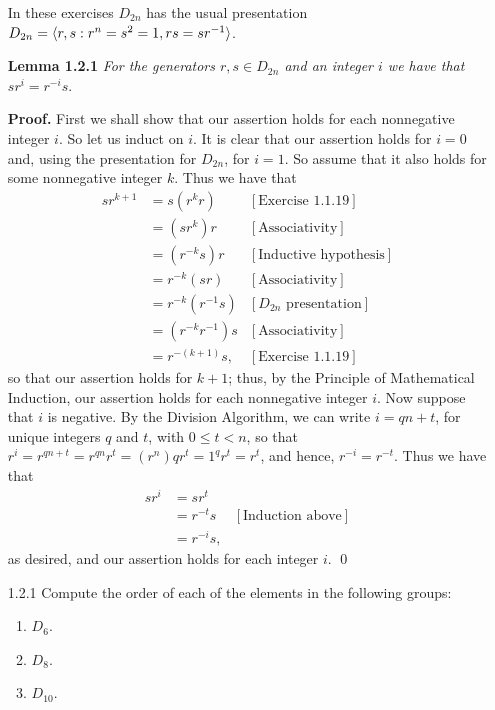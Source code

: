 \begin{enumerate}
   \item[]        In these exercises $D_{2n}$ has the usual presentation
                  $D_{2n} = \langle r, s : r^n = s^2 = 1, rs = sr^{-1} \rangle$.
   \item[]        \textbf{Lemma 1.2.1} \textit{For the generators
                  $r, s \in D_{2n}$ and an integer $i$ we have that
                  $sr^i = r^{-i}s$}.
                  
      \textbf{Proof.} First we shall show that our assertion holds for each
      nonnegative integer $i$. So let us induct on $i$. It is clear that our
      assertion holds for $i = 0$ and, using the presentation for $D_{2n}$, for
      $i = 1$. So assume that it also holds for some nonnegative integer $k$.
      Thus we have that
      \begin{align*}
         sr^{k + 1} &= s(r^kr) &[\text{Exercise 1.1.19}] \\
                    &= (sr^k)r &[\text{Associativity}] \\
                    &= (r^{-k}s)r &[\text{Inductive hypothesis}] \\
                    &= r^{-k}(sr) &[\text{Associativity}] \\
                    &= r^{-k}(r^{-1}s) &[D_{2n} \text{ presentation}] \\
                    &= (r^{-k}r^{-1})s &[\text{Associativity}] \\
                    &= r^{-(k+1)}s, &[\text{Exercise 1.1.19}]
      \end{align*}
      so that our assertion holds for $k + 1$; thus, by the Principle of 
      Mathematical Induction, our assertion holds for each nonnegative integer 
      $i$. Now suppose that $i$ is negative. By the Division Algorithm, we can 
      write $i = qn + t$, for unique integers $q$ and $t$, with $0 \le t < n$, 
      so that $r^i = r^{qn+t} = r^{qn}r^t = (r^n)qr^t = 1^qr^t = r^t$, and 
      hence, $r^{-i} = r^{-t}$. Thus we have that
      \begin{align*}
         sr^i &= sr^t \\
              &= r^{-t}s &[\text{Induction above}] \\
              &= r^{-i}s,
      \end{align*}
      as desired, and our assertion holds for each integer $i$. \qed
   \item[1.2.1]   Compute the order of each of the elements in the following
                  groups:
                  \begin{enumerate}
                     \item $D_6$.
                     \item $D_8$.
                     \item $D_{10}$.
                  \end{enumerate}
                 

\end{enumerate}
